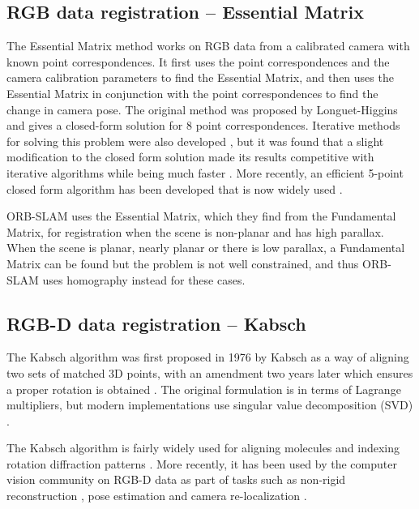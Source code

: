 \documentclass[12pt,a4paper]{article}
\begin{document}
  \subsection{RGB data registration -- Essential Matrix}
    \label{ssec: LR EM}
    The Essential Matrix method works on RGB data from a calibrated camera with known point correspondences. It first uses the point correspondences and the camera calibration parameters to find the Essential Matrix, and then uses the Essential Matrix in conjunction with the point correspondences to find the change in camera pose. The original method was proposed by Longuet-Higgins \cite{longuet1981computer} and gives a closed-form solution for 8 point correspondences. Iterative methods for solving this problem were also developed \cite{haralick1989pose}, but it was found that a slight modification to the closed form solution made its results competitive with iterative algorithms while being much faster \cite{hartley1995defence}. More recently, an efficient 5-point closed form algorithm has been developed that is now widely used \cite{nister2003efficient}.
     
    ORB-SLAM \cite{mur2015orb} uses the Essential Matrix, which they find from the Fundamental Matrix, for registration when the scene is non-planar and has high parallax. When the scene is planar, nearly planar or there is low parallax, a Fundamental Matrix can be found but the problem is not well constrained, and thus ORB-SLAM uses homography instead for these cases.

  \subsection{RGB-D data registration -- Kabsch}
    \label{ssec: Kabsch}
    The Kabsch algorithm was first proposed in 1976 by Kabsch \cite{kabsch1976solution} as a way of aligning two sets of matched 3D points, with an amendment two years later which ensures a proper rotation is obtained \cite{kabsch1978discussion}. The original formulation is in terms of Lagrange multipliers, but modern implementations use singular value decomposition (SVD) \cite{kavraki2009geometric}.
     
    The Kabsch algorithm is fairly widely used for aligning molecules \cite{kavraki2009geometric,goldschmidt2010identifying} and indexing rotation diffraction patterns \cite{kabsch1988automatic,kabsch2010xds}. More recently, it has been used by the computer vision community on RGB-D data as part of tasks such as non-rigid reconstruction \cite{zollhofer2014real}, pose estimation \cite{brachmann2014learning} and camera re-localization \cite{shotton2013scene}. 
\end{document}

